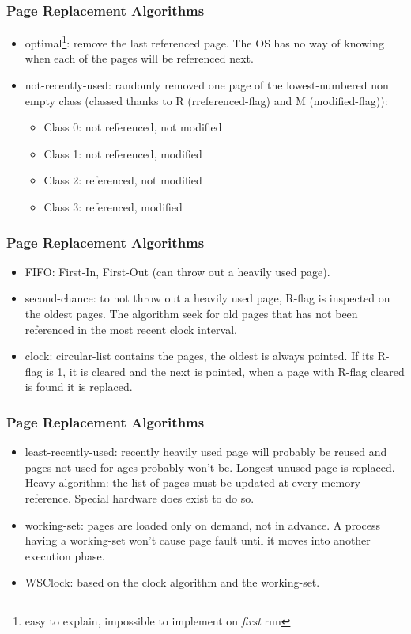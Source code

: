   \begin{frame}
    \frametitle{Page Replacement Algorithms}
    \begin{itemize}
      \item optimal\footnote{easy to explain, impossible to implement on \emph{first} run}: remove the last referenced page. The OS has no way of knowing when each of the pages will be referenced next.
      \item not-recently-used: randomly removed one page of the lowest-numbered non empty class (classed thanks to R (rreferenced-flag) and M (modified-flag)):
      \begin{itemize}
        \item Class 0: not referenced, not modified
        \item Class 1: not referenced, modified
        \item Class 2: referenced, not modified
        \item Class 3: referenced, modified
      \end{itemize}
    \end{itemize}
  \end{frame}

  \begin{frame}
    \frametitle{Page Replacement Algorithms}
    \begin{itemize}
      \item FIFO: First-In, First-Out (can throw out a heavily used page).
      \item second-chance: to not throw out a heavily used page, R-flag is inspected on the oldest pages. The algorithm seek for old pages that has not been referenced in the most recent clock interval.
      \item clock: circular-list contains the pages, the oldest is always pointed. If its R-flag is 1, it is cleared and the next is pointed, when a page with R-flag cleared is found it is replaced.
    \end{itemize}
  \end{frame}

  \begin{frame}
    \frametitle{Page Replacement Algorithms}
    \begin{itemize}
      \item least-recently-used: recently heavily used page will probably be reused and pages not used for ages probably won't be. Longest unused page is replaced. Heavy algorithm: the list of pages must be updated at every memory reference. Special hardware does exist to do so.
      \item working-set: pages are loaded only on demand, not in advance. A process having a working-set won't cause page fault until it moves into another execution phase.
      \item WSClock: based on the clock algorithm and the working-set.
    \end{itemize}
  \end{frame}

